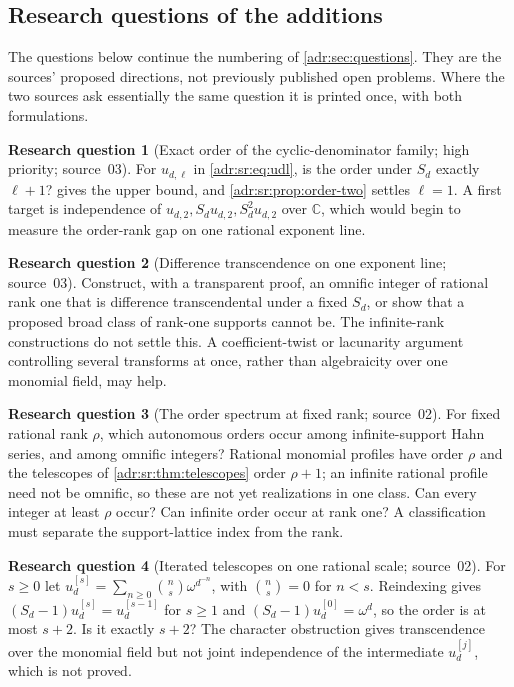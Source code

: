 \documentclass[11pt,letterpaper]{article}
\numberwithin{equation}{section}
\theoremstyle{definition}
\newtheorem{question}{Research question}
\theoremstyle{remark}
\newcommand{\C}{\mathbb C}
\begin{document}
\subsection{Research questions of the additions}
\label{adr:sr:sec:questions}

The questions below continue the numbering of \cref{adr:sec:questions}. They
are the sources' proposed directions, not previously published open problems.
Where the two sources ask essentially the same question it is printed once,
with both formulations.

\begin{question}[Exact order of the cyclic-denominator family; high priority; source~03]
\label{adr:sr:q:udl}
For $u_{d,\ell}$ in \eqref{adr:sr:eq:udl}, is the order under $S_d$ exactly
$\ell+1$?  gives the upper bound, and
\cref{adr:sr:prop:order-two} settles $\ell=1$. A first target is independence
of $u_{d,2},S_du_{d,2},S_d^2u_{d,2}$ over $\C$, which would begin to measure the
order-rank gap on one rational exponent line.
\end{question}

\begin{question}[Difference transcendence on one exponent line; source~03]
Construct, with a transparent proof, an omnific integer of rational rank one
that is difference transcendental under a fixed $S_d$, or show that a proposed
broad class of rank-one supports cannot be. The infinite-rank constructions do
not settle this. A coefficient-twist or lacunarity argument controlling several
transforms at once, rather than algebraicity over one monomial field, may help.
\end{question}

\begin{question}[The order spectrum at fixed rank; source~02]
For fixed rational rank $\rho$, which autonomous orders occur among
infinite-support Hahn series, and among omnific integers? Rational monomial
profiles have order $\rho$ and the telescopes of \cref{adr:sr:thm:telescopes}
order $\rho+1$; an infinite rational profile need not be omnific, so these are
not yet realizations in one class. Can every integer at least $\rho$ occur? Can
infinite order occur at rank one? A classification must separate the
support-lattice index from the rank.
\end{question}

\begin{question}[Iterated telescopes on one rational scale; source~02]
\label{adr:sr:q:iterated}
For $s\ge0$ let $u_d^{[s]}=\sum_{n\ge0}\binom ns\omega^{d^{-n}}$, with
$\binom ns=0$ for $n<s$. Reindexing gives $(S_d-1)u_d^{[s]}=u_d^{[s-1]}$ for
$s\ge1$ and $(S_d-1)u_d^{[0]}=\omega^d$, so the order is at most $s+2$. Is it
exactly $s+2$? The character obstruction gives transcendence over the monomial
field but not joint independence of the intermediate $u_d^{[j]}$, which is not
proved.
\end{question}
\end{document}
